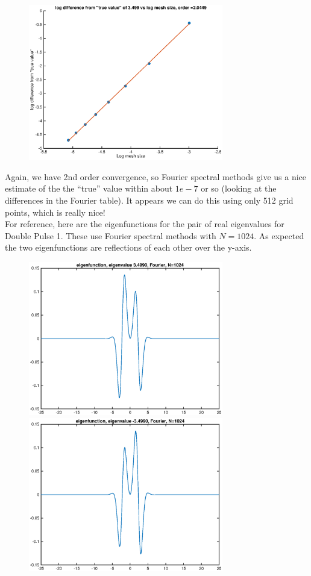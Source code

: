 \documentclass[12pt]{article}
\begin{document}
\begin{figure}[H]
\includegraphics[width=8.5cm]{1double1fdeigtrue}
\end{figure}

Again, we have 2nd order convergence, so Fourier spectral methods give us a nice estimate of the the ``true'' value within about $1e-7$ or so (looking at the differences in the Fourier table). It appears we can do this using only 512 grid points, which is really nice!\\

For reference, here are the eigenfunctions for the pair of real eigenvalues for Double Pulse 1. These use Fourier spectral methods with $N = 1024$. As expected the two eigenfunctions are reflections of each other over the y-axis.
\begin{figure}[H]
\includegraphics[width=8.5cm]{1double1fouriereigenfnplus}
\includegraphics[width=8.5cm]{1double1fouriereigenfnminus}
\end{figure}
\end{document}
